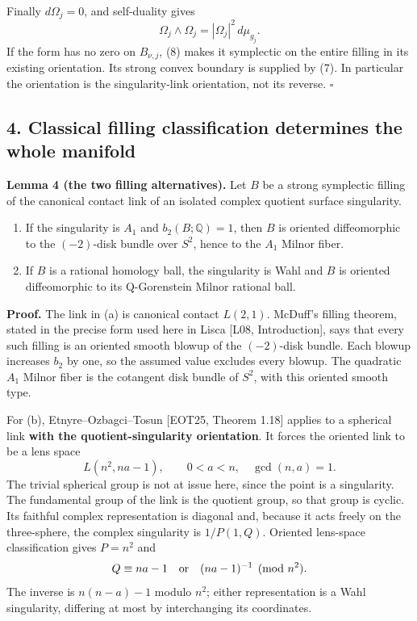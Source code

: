 \documentclass[
  11pt,
]{article}
\begin{document}
Finally \(d\Omega_j=0\), and self-duality gives \[
             \Omega_j\wedge\Omega_j=|\Omega_j|^2\,d\mu_{g_j}.
                                                                    \tag{8}
\] If the form has no zero on \(B_{\nu,j}\), (8) makes it symplectic on
the entire filling in its existing orientation. Its strong convex
boundary is supplied by (7). In particular the orientation is the
singularity-link orientation, not its reverse. \(\square\)

\hypertarget{classical-filling-classification-determines-the-whole-manifold}{%
\subsection{4. Classical filling classification determines the whole
manifold}\label{classical-filling-classification-determines-the-whole-manifold}}

\textbf{Lemma 4 (the two filling alternatives).} Let \(B\) be a strong
symplectic filling of the canonical contact link of an isolated complex
quotient surface singularity.

\begin{enumerate}
\def\labelenumi{(\alph{enumi})}
\item
  If the singularity is \(A_1\) and \(b_2(B;\mathbb Q)=1\), then \(B\)
  is oriented diffeomorphic to the \((-2)\)-disk bundle over \(S^2\),
  hence to the \(A_1\) Milnor fiber.
\item
  If \(B\) is a rational homology ball, the singularity is Wahl and
  \(B\) is oriented diffeomorphic to its Q-Gorenstein Milnor rational
  ball.
\end{enumerate}

\textbf{Proof.} The link in (a) is canonical contact \(L(2,1)\).
McDuff's filling theorem, stated in the precise form used here in Lisca
{[}L08, Introduction{]}, says that every such filling is an oriented
smooth blowup of the \((-2)\)-disk bundle. Each blowup increases \(b_2\)
by one, so the assumed value excludes every blowup. The quadratic
\(A_1\) Milnor fiber is the cotangent disk bundle of \(S^2\), with this
oriented smooth type.

For (b), Etnyre--Ozbagci--Tosun {[}EOT25, Theorem 1.18{]} applies to a
spherical link \textbf{with the quotient-singularity orientation}. It
forces the oriented link to be a lens space \[
                        L(n^2,na-1),
            \qquad 0<a<n,\quad\gcd(n,a)=1.             \tag{9}
\] The trivial spherical group is not at issue here, since the point is
a singularity. The fundamental group of the link is the quotient group,
so that group is cyclic. Its faithful complex representation is diagonal
and, because it acts freely on the three-sphere, the complex singularity
is \(1/P(1,Q)\). Oriented lens-space classification gives \(P=n^2\) and
\[
 Q\equiv na-1\quad\hbox{or}\quad (na-1)^{-1}\pmod{n^2}.
\] The inverse is \(n(n-a)-1\) modulo \(n^2\); either representation is
a Wahl singularity, differing at most by interchanging its coordinates.
\end{document}
